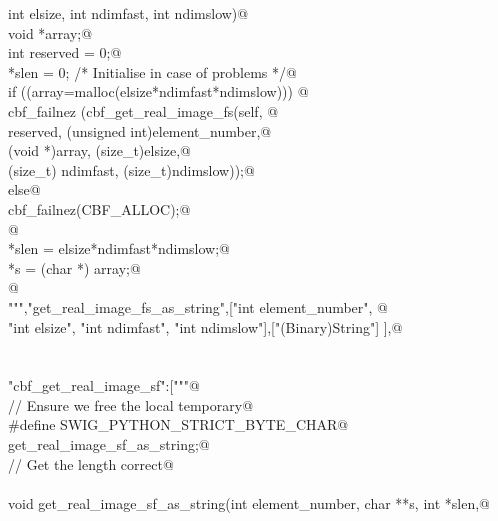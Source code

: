 \documentclass[10pt,a4paper,twoside,notitlepage]{article}
\begin{document}
\begin{flushleft}
\begin{minipage}{\linewidth}
\begin{list}{}{}
\mbox{}\verb@    int elsize, int ndimfast, int ndimslow){@\\
\mbox{}\verb@        void *array;@\\
\mbox{}\verb@        int reserved = 0;@\\
\mbox{}\verb@        *slen = 0; /* Initialise in case of problems */@\\
\mbox{}\verb@        if ((array=malloc(elsize*ndimfast*ndimslow))) {@\\
\mbox{}\verb@               cbf_failnez (cbf_get_real_image_fs(self, @\\
\mbox{}\verb@               reserved, (unsigned int)element_number,@\\
\mbox{}\verb@               (void *)array, (size_t)elsize,@\\
\mbox{}\verb@               (size_t) ndimfast, (size_t)ndimslow));@\\
\mbox{}\verb@         }else{@\\
\mbox{}\verb@               cbf_failnez(CBF_ALLOC);@\\
\mbox{}\verb@         }@\\
\mbox{}\verb@        *slen = elsize*ndimfast*ndimslow;@\\
\mbox{}\verb@        *s = (char *) array;@\\
\mbox{}\verb@      }@\\
\mbox{}\verb@""","get_real_image_fs_as_string",["int element_number", @\\
\mbox{}\verb@    "int elsize", "int ndimfast", "int ndimslow"],["(Binary)String"] ],@\\
\mbox{}\verb@@\\
\mbox{}\verb@@\\
\mbox{}\verb@"cbf_get_real_image_sf":["""@\\
\mbox{}\verb@// Ensure we free the local temporary@\\
\mbox{}\verb@%{@\\
\mbox{}\verb@#define SWIG_PYTHON_STRICT_BYTE_CHAR@\\
\mbox{}\verb@%}@\\
\mbox{}\verb@%cstring_output_allocate_size(char ** s, int *slen, free(*$1))@\\
\mbox{}\verb@       get_real_image_sf_as_string;@\\
\mbox{}\verb@// Get the length correct@\\
\mbox{}\verb@@\\
\mbox{}\verb@    void get_real_image_sf_as_string(int element_number, char **s, int *slen,@\\

\end{list}
\end{minipage}
\end{flushleft}
\end{document}
